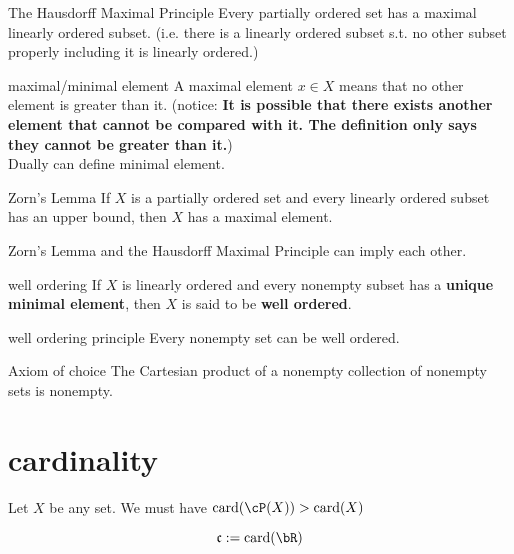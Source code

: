 \documentclass[lang=cn,11pt]{elegantbook}
\begin{document}
\begin{axiom}{The Hausdorff Maximal Principle}\label{The Hausdorff Maximal Principle}
Every partially ordered set has a maximal linearly ordered subset. (i.e. there is a linearly ordered subset s.t. no other subset properly including it is linearly ordered.)
\end{axiom}

\begin{definition}{maximal/minimal element}
    A maximal element $x \in X$ means that no other element is greater than it. (notice: \textbf{It is possible that there exists another element that cannot be compared with it. The definition only says they cannot be greater than it.})\\
    Dually can define minimal element.
\end{definition}
\begin{axiom}{Zorn's Lemma} \label{Zorn's Lemma}
If $X$ is a partially ordered set and every linearly ordered subset has an upper bound, then $X$ has a maximal element.
\end{axiom}
\begin{remark}
    Zorn's Lemma and the Hausdorff Maximal Principle can imply each other.
\end{remark}

\begin{definition}{well ordering}
If $X$ is linearly ordered and every nonempty subset has a \textbf{unique minimal element}, then $X$ is said to be \textbf{well ordered}.
\end{definition}


\begin{lemma}{well ordering principle}
    Every nonempty set can be well ordered.
\end{lemma}

\begin{corollary}{Axiom of choice}
    The Cartesian product of a nonempty collection of nonempty sets is nonempty.
\end{corollary}

\section{cardinality}
\begin{proposition}
    Let $X$ be any set. We must have $\card(\cP(X)) > \card(X)$
\end{proposition}

\begin{definition}
 $$\mathfrak{c} := \card(\bR)$$
\end{definition}
\end{document}
